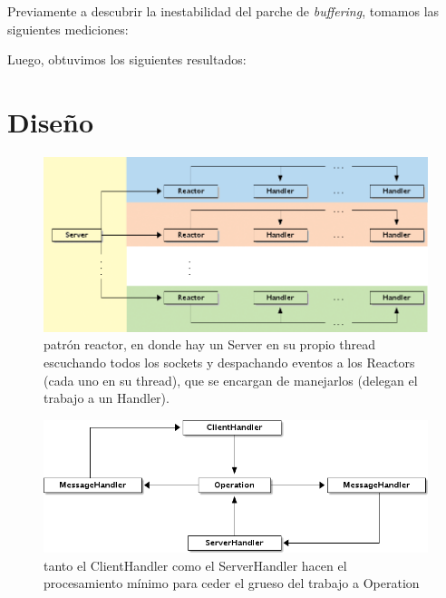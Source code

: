 \documentclass[11pt,a4paper,titlepage]{article}
\begin{document}
    Previamente a descubrir la inestabilidad del parche de \textit{buffering}, tomamos las siguientes mediciones:


    Luego, obtuvimos los siguientes resultados:




\newpage

\section{Diseño}

	\begin{figure}[ht]
    		\centering
    		\includegraphics[width=\textwidth]{img/server_reactor_diagram_pro.png}
    		\caption{patrón reactor, en donde hay un Server en su propio thread escuchando todos los
                     sockets y despachando eventos a los Reactors (cada uno en su thread), que se encargan
                     de manejarlos (delegan el trabajo a un Handler).}
	\end{figure}

    \vspace{2cm}

	\begin{figure}[ht]
    		\centering
    		\includegraphics[width=\textwidth]{img/handler_diagram_pro.png}
    		\caption{tanto el ClientHandler como el ServerHandler hacen el procesamiento mínimo para
                     ceder el grueso del trabajo a Operation}
	\end{figure}
\end{document}
